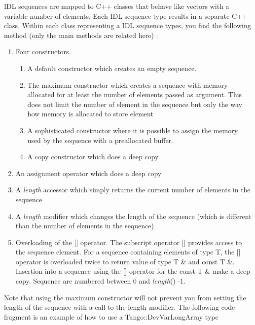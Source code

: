IDL sequences are mapped to C++ classes that behave
like vectors with a variable number of elements. Each IDL sequence
type results in a separate C++ class. Within each class representing
a IDL sequence types, you find the following method (only the main
methods are related here) :
\begin{enumerate}
\item Four constructors. 

\begin{enumerate}
\item A default constructor which creates an empty sequence.
\item The maximum constructor which creates a sequence with memory allocated
for at least the number of elements passed as argument. This does
not limit the number of element in the sequence but only the way how
memory is allocated to store element
\item A sophisticated constructor where it is possible to assign the memory
used by the sequence with a preallocated buffer.
\item A copy constructor which does a deep copy
\end{enumerate}
\item An assignment operator which does a deep copy
\item A \emph{length} accessor which simply returns the current number of
elements in the sequence
\item A \emph{length} modifier which changes the length of
the sequence (which is different than the number of elements in the
sequence)
\item Overloading of the {[}{]} operator. The subscript operator {[}{]}
provides access to the sequence element. For a sequence containing
elements of type T, the {[}{]} operator is overloaded twice to return
value of type T \& and const T \&. Insertion into a sequence using
the {[}{]} operator for the const T \& make a deep copy. Sequence
are numbered between 0 and \emph{length}() -1.
\end{enumerate}
Note that using the maximum constructor will not prevent you from
setting the length of the sequence with a call to the length modifier.
The following code fragment is an example of how to use a Tango::DevVarLongArray
type


